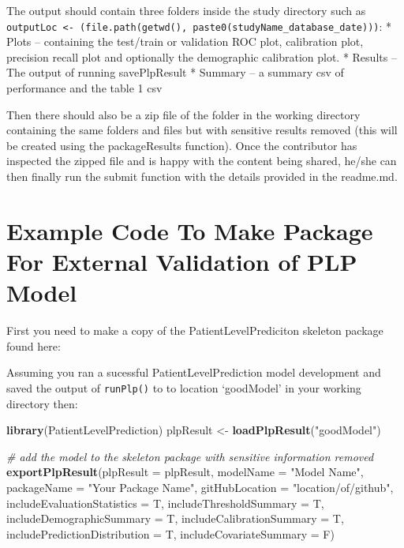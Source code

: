\documentclass[
]{article}
\newenvironment{Shaded}{\begin{snugshade}}{\end{snugshade}}
\newcommand{\CommentTok}[1]{\textcolor[rgb]{0.56,0.35,0.01}{\textit{#1}}}
\newcommand{\DataTypeTok}[1]{\textcolor[rgb]{0.13,0.29,0.53}{#1}}
\newcommand{\KeywordTok}[1]{\textcolor[rgb]{0.13,0.29,0.53}{\textbf{#1}}}
\newcommand{\NormalTok}[1]{#1}
\newcommand{\StringTok}[1]{\textcolor[rgb]{0.31,0.60,0.02}{#1}}
\begin{document}
The output should contain three folders inside the study directory such
as
\texttt{outputLoc\ \textless{}-\ (file.path(getwd(),\ paste0(studyName\_database\_date)))}:
* Plots -- containing the test/train or validation ROC plot, calibration
plot, precision recall plot and optionally the demographic calibration
plot. * Results -- The output of running savePlpResult * Summary -- a
summary csv of performance and the table 1 csv

Then there should also be a zip file of the folder in the working
directory containing the same folders and files but with sensitive
results removed (this will be created using the packageResults
function). Once the contributor has inspected the zipped file and is
happy with the content being shared, he/she can then finally run the
submit function with the details provided in the readme.md.

\hypertarget{example-code-to-make-package-for-external-validation-of-plp-model}{%
\section{Example Code To Make Package For External Validation of PLP
Model}\label{example-code-to-make-package-for-external-validation-of-plp-model}}

First you need to make a copy of the PatientLevelPrediciton skeleton
package found here:

Assuming you ran a sucessful PatientLevelPrediction model development
and saved the output of \texttt{runPlp()} to to location `goodModel' in
your working directory then:

\begin{Shaded}
\begin{Highlighting}[]
\KeywordTok{library}\NormalTok{(PatientLevelPrediction)}
\NormalTok{plpResult <-}\StringTok{ }\KeywordTok{loadPlpResult}\NormalTok{(}\StringTok{"goodModel"}\NormalTok{)}

\CommentTok{# add the model to the skeleton package with sensitive information removed}
\KeywordTok{exportPlpResult}\NormalTok{(}\DataTypeTok{plpResult =}\NormalTok{ plpResult, }\DataTypeTok{modelName =} \StringTok{"Model Name"}\NormalTok{, }\DataTypeTok{packageName =} \StringTok{"Your Package Name"}\NormalTok{, }
    \DataTypeTok{gitHubLocation =} \StringTok{"location/of/github"}\NormalTok{, }\DataTypeTok{includeEvaluationStatistics =}\NormalTok{ T, }\DataTypeTok{includeThresholdSummary =}\NormalTok{ T, }
    \DataTypeTok{includeDemographicSummary =}\NormalTok{ T, }\DataTypeTok{includeCalibrationSummary =}\NormalTok{ T, }\DataTypeTok{includePredictionDistribution =}\NormalTok{ T, }
    \DataTypeTok{includeCovariateSummary =}\NormalTok{ F)}
\end{Highlighting}
\end{Shaded}
\end{document}
